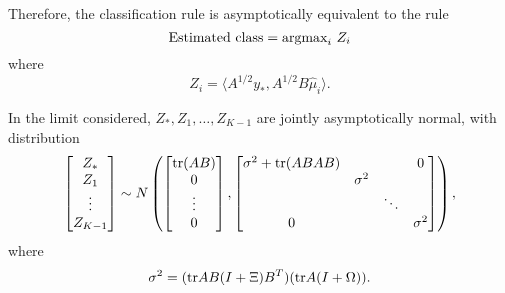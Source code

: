 \documentclass[12pt]{article}
\begin{document}
Therefore, the classification rule is asymptotically equivalent to the rule
\[
\text{Estimated class} = \text{argmax}_i\ Z_i
\]
where
\[
Z_i = \langle A^{1/2}y_*, A^{1/2}B\hat{\mu}_i \rangle.
\]

In the limit considered, $Z_*, Z_1,\hdots, Z_{K-1}$ are jointly asymptotically normal, with distribution
\[
\begin{bmatrix}
Z_* \\ Z_1 \\ \vdots \\ Z_{K-1}
\end{bmatrix}
\sim 
N\left(
\begin{bmatrix}
\text{tr}(AB)\\0\\\vdots\\0
\end{bmatrix},
\begin{bmatrix}
\sigma^2 + \text{tr}(ABAB) & & & 0\\
 & \sigma^2 & &\\
 & & \ddots &\\
0 & & & \sigma^2
\end{bmatrix}
\right),
\]
where
\[
\sigma^2 = (\text{tr} A B (I + \Xi)B^T)(\text{tr} A (I + \Omega)).
\]
\end{document}
